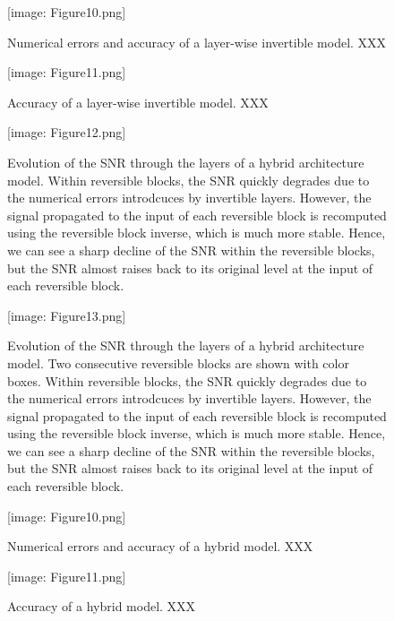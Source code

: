 \documentclass[twocolumn]{bmcart}
\def\texttt{[image: ]}
\begin{document}
\begin{backmatter}
\begin{figure}[t]
\texttt{[image: Figure10.png]}
\caption{
Numerical errors and accuracy of a layer-wise invertible model. XXX
}
\end{figure}

\begin{figure}[t]
\texttt{[image: Figure11.png]}
\caption{
Accuracy of a layer-wise invertible model. XXX
}
\end{figure}

\begin{figure}[t]
\texttt{[image: Figure12.png]}
\caption{
Evolution of the SNR through the layers of a hybrid architecture model.
Within reversible blocks, the SNR quickly degrades due to the numerical errors introdcuces by invertible layers.
However, the signal propagated to the input of each reversible block is recomputed using the reversible block inverse, which is much more stable.
Hence, we can see a sharp decline of the SNR within the reversible blocks, but the SNR almost raises back to its original level at the input of each reversible block. 
}
\end{figure}


\begin{figure}[t]
\texttt{[image: Figure13.png]}
\caption{
Evolution of the SNR through the layers of a hybrid architecture model.
Two consecutive reversible blocks are shown with color boxes.
Within reversible blocks, the SNR quickly degrades due to the numerical errors introdcuces by invertible layers.
However, the signal propagated to the input of each reversible block is recomputed using the reversible block inverse, which is much more stable.
Hence, we can see a sharp decline of the SNR within the reversible blocks, but the SNR almost raises back to its original level at the input of each reversible block. 
}
\end{figure}

\begin{figure}[t]
\texttt{[image: Figure10.png]}
\caption{
Numerical errors and accuracy of a hybrid model. XXX
}
\end{figure}

\begin{figure}[t]
\texttt{[image: Figure11.png]}
\caption{
Accuracy of a hybrid model. XXX
}
\end{figure}

\end{backmatter}
\end{document}
